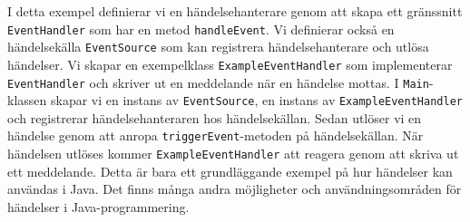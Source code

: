\begin{Shaded}
\begin{Highlighting}[]
\OperatorTok{=}  \OperatorTok{();}
\OperatorTok{=}  \OperatorTok{();}
\OperatorTok{(}\OperatorTok{);}
\OperatorTok{(}\OperatorTok{);}
\end{Highlighting}
\end{Shaded}

I detta exempel definierar vi en händelsehanterare genom att skapa ett
gränssnitt \texttt{EventHandler} som har en metod \texttt{handleEvent}.
Vi definierar också en händelsekälla \texttt{EventSource} som kan
registrera händelsehanterare och utlösa händelser. Vi skapar en
exempelklass \texttt{ExampleEventHandler} som implementerar
\texttt{EventHandler} och skriver ut en meddelande när en händelse
mottas. I \texttt{Main}-klassen skapar vi en instans av
\texttt{EventSource}, en instans av \texttt{ExampleEventHandler} och
registrerar händelsehanteraren hos händelsekällan. Sedan utlöser vi en
händelse genom att anropa \texttt{triggerEvent}-metoden på
händelsekällan. När händelsen utlöses kommer
\texttt{ExampleEventHandler} att reagera genom att skriva ut ett
meddelande. Detta är bara ett grundläggande exempel på hur händelser kan
användas i Java. Det finns många andra möjligheter och
användningsområden för händelser i Java-programmering.

